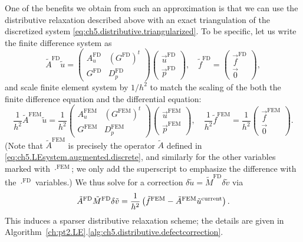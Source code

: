 One of the benefits we obtain from such an approximation is that we can use the distributive relaxation described above with an exact triangulation of the discretized system \eqref{eq:ch5.distributive.triangularized}. To be specific, let us write the finite difference system as
\begin{equation*}
\tilde{A}^{\text{FD}} \tilde{u} =
\begin{pmatrix} A_u^{\text{FD}} & (G^{\text{FD}})^t \\ G^{\text{FD}} & D_p^{\text{FD}} \end{pmatrix}
\begin{pmatrix} \vec{u}^{\text{FD}} \\ \vec{p}^{\text{FD}} \end{pmatrix}, \quad
\tilde{f}^{\text{FD}} = \begin{pmatrix} \vec{f}^{\text{FD}} \\ \vec{0} \end{pmatrix},
\end{equation*}
and scale finite element system by $1/h^2$ to match the scaling of the both the finite difference equation and the differential equation:
\begin{equation*}
\frac{1}{h^2} \tilde{A}^{\text{FEM}} \tilde{u} =
\frac{1}{h^2} \begin{pmatrix} A_u^{\text{FEM}} & (G^{\text{FEM}})^t \\ G^{\text{FEM}} & D_p^{\text{FEM}} \end{pmatrix}
\begin{pmatrix} \vec{u}^{\text{FEM}} \\ \vec{p}^{\text{FEM}} \end{pmatrix}, \quad
\frac{1}{h^2} \tilde{f}^{\text{FEM}} = \frac{1}{h^2} \begin{pmatrix} \vec{f}^{\text{FEM}} \\ \vec{0} \end{pmatrix}.
\end{equation*}
(Note that $\tilde{A}^{\text{FEM}}$ is precisely the operator $\tilde{A}$ defined in \eqref{eq:ch5.LEsystem.augmented.discrete}, and similarly for the other variables marked with $\cdot^{\text{FEM}}$; we only add the superscript to emphasize the difference with the $\cdot^{\text{FD}}$ variables.) We thus solve for a correction $\delta\tilde{u} = \tilde{M}^{\text{FD}} \delta\tilde{v}$ via
\begin{equation*}
\tilde{A}^{\text{FD}} \tilde{M}^{\text{FD}} \delta\tilde{v} = \frac{1}{h^2} \left( \tilde{f}^{\text{FEM}} - \tilde{A}^{\text{FEM}} \tilde{u}^{\text{current}} \right).
\end{equation*}
This induces a sparser distributive relaxation scheme; the details are given in Algorithm~\ref{ch:pt2.LE}.\ref{alg:ch5.distributive.defectcorrection}.

